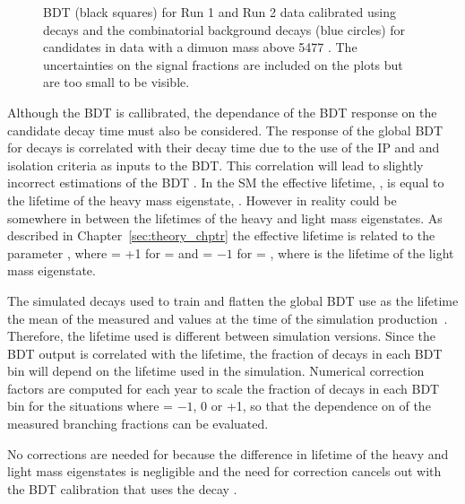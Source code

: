 \begin{figure}[tbp]
\begin{subfigure}[b]{0.48\textwidth}
   \end{subfigure}
    \caption{\bmumu BDT \pdfs (black squares) for Run 1 and Run 2 data calibrated using \bdkpi decays and the combinatorial background decays (blue circles) for \bmumu candidates in data with a dimuon mass above 5477 \mevcc. The uncertainties on the signal fractions are included on the plots but are too small to be visible. }
    \label{fig:BDTpdfs}
\end{figure}


Although the BDT is callibrated, the dependance of the BDT response on the \bsd candidate decay time must also be considered. 
The response of the global BDT for \bmumu decays is correlated with their decay time due to the use of the \bs IP and \chiIP and isolation criteria as inputs to the BDT. This correlation will lead to slightly incorrect estimations of the \bsmumu BDT \pdf. In the SM the \bsmumu effective lifetime, \tmumu, is equal to the lifetime of the heavy \bs mass eigenstate, \tH. However in reality \tmumu could be somewhere in between the lifetimes of the heavy and light mass eigenstates. As described in Chapter~\ref{sec:theory_chptr} the \bsmumu effective lifetime is related to the parameter \ADG, where \ADG = +1 for \tmumu = \tH and \ADG = $-1$ for \tmumu = \tL, where \tL is the lifetime of the light \bsmumu mass eigenstate.

The simulated decays used to train and flatten the global BDT use as the \bsmumu lifetime the mean of the measured \tH and \tL values at the time of the simulation production~\cite{Olive:2016xmw}. Therefore, the lifetime used is different between simulation versions. Since the BDT output is correlated with the lifetime, the fraction of \bsmumu decays in each BDT bin will depend on the lifetime used in the simulation. Numerical correction factors are computed for each year to scale the fraction of \bsmumu decays in each BDT bin for the situations where \ADF = $-1$, 0 or +1, so that the dependence on \ADG of the measured branching fractions can be evaluated.

No corrections are needed for \bdmumu because the difference in lifetime of the heavy and light \bd mass eigenstates is negligible and the need for correction cancels out with the BDT calibration that uses the \bd decay \bdkpi. 

